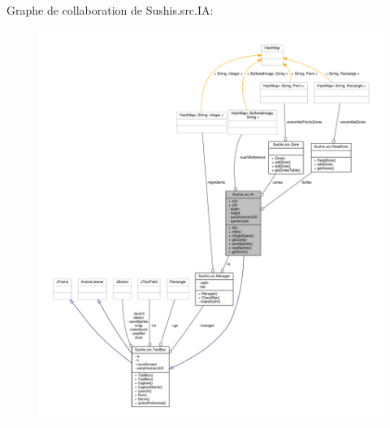 Graphe de collaboration de Sushis.\+src.\+I\+A\+:\nopagebreak
\begin{figure}[H]
\begin{center}
\leavevmode
\includegraphics[width=350pt]{classSushis_1_1src_1_1IA__coll__graph}
\end{center}
\end{figure}

